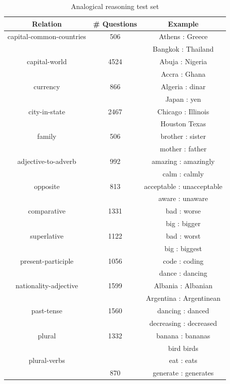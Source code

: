 \begin{table}[h]
\small
	\caption{Analogical reasoning test set}
	\label{table:analogical}
	\centering
    \begin{tabular}{| c |  c | c |}
    \hline
    {\bf Relation} & {\bf \# Questions} & {\bf Example} \\
    \hline
     capital-common-countries & 506 & Athens : Greece \\
     & & Bangkok : Thailand\\
     \hline
    capital-world &   4524  & Abuja : Nigeria \\
    & & Accra : Ghana\\
    \hline
    currency & 866 & Algeria : dinar\\
    & & Japan : yen\\
   \hline
   city-in-state & 2467 & Chicago : Illinois \\
   & & Houston Texas\\
   \hline
    family &  506 & brother : sister \\
    & & mother : father\\
    \hline
    adjective-to-adverb & 992 & amazing : amazingly \\
    & & calm : calmly\\
    \hline
    opposite & 813 & acceptable : unacceptable \\
    & & aware : unaware\\
    \hline
    comparative & 1331 & bad : worse \\
    & & big : bigger\\
    \hline
    superlative & 1122 & bad : worst \\
    & & big : biggest\\
    \hline
    present-participle & 1056 & code : coding\\
    & & dance : dancing\\
    \hline
    nationality-adjective & 1599 & Albania : Albanian \\
    & & Argentina : Argentinean\\
    \hline
    past-tense & 1560 & dancing : danced \\
    & & decreasing : decreased\\
    \hline
    plural & 1332 & banana : bananas \\
    & & bird birds\\
    \hline
    plural-verbs &  & eat : eats \\
    & 870 & generate : generates\\
    \hline
    \end{tabular}
\end{table}



